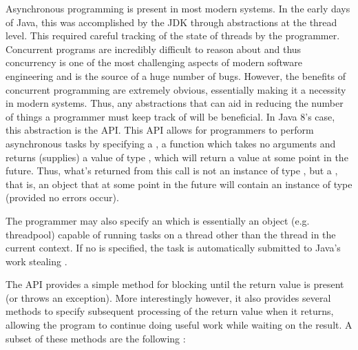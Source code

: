 


Asynchronous programming is present in most modern systems. In the early days of Java, this was accomplished by the JDK through abstractions at the thread level. This required careful tracking of the state of threads by the programmer. Concurrent programs are incredibly difficult to reason about and thus concurrency is one of the most challenging aspects of modern software engineering and is the source of a huge number of bugs. However, the benefits of concurrent programming are extremely obvious, essentially making it a necessity in modern systems. Thus, any abstractions that can aid in reducing the number of things a programmer must keep track of will be beneficial. In Java 8's case, this abstraction is the  API. This API allows for programmers to perform asynchronous tasks by specifying a , a function which takes no arguments and returns (supplies) a value of type , which will return a value at some point in the future. Thus, what's returned from this call is not an instance of type , but a , that is, an object that at some point in the future will contain an instance of type  (provided no errors occur). 

The programmer may also specify an  \cite{javaExecutor} which is essentially an object (e.g. threadpool) capable of running tasks on a thread other than the thread in the current context. If no  is specified, the task is automatically submitted to Java's work stealing  \cite{javaForkJoinPool}. 

The API provides a simple  method for blocking until the return value is present (or throws an exception). More interestingly however, it also provides several methods to specify subsequent processing of the return value when it returns, allowing the program to continue doing useful work while waiting on the result. A subset of these methods are the following \cite{javaCfArticle}:

